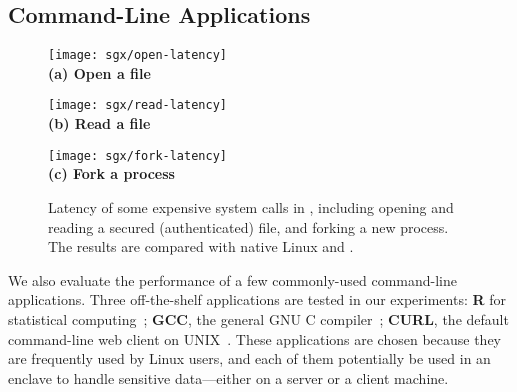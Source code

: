 

\subsection{Command-Line Applications}

\begin{figure*}[t!]
\centering

\begin{minipage}{.3\textwidth}
\centering
\texttt{[image: sgx/open-latency]}\\
{\bf (a) Open a file}
\end{minipage}
\begin{minipage}{.3\textwidth}
\centering
\texttt{[image: sgx/read-latency]}\\
{\bf (b) Read a file}
\end{minipage}
\begin{minipage}{.3\textwidth}
\centering
\texttt{[image: sgx/fork-latency]}\\
{\bf (c) Fork a process}
\end{minipage}

\caption{Latency of some expensive system calls in \graphenesgx{}, including opening and reading a secured (authenticated) file, and forking a new process. The results are compared with native Linux and \graphene{}.}
\label{fig:syscall}
\end{figure*}


We also evaluate the performance of a few commonly-used command-line applications.
Three off-the-shelf applications are tested in our experiments:
{\bf R} for statistical computing~\cite{r-project}; {\bf GCC}, the general GNU C compiler~\cite{gcc}; {\bf CURL}, the default command-line web client on UNIX~\cite{curl}.
These applications are chosen because they are frequently used by Linux users,
and each of them potentially  be used 
in an enclave to handle sensitive data---either on a server or a client
machine.



